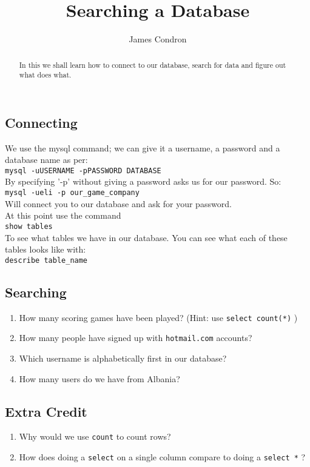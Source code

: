 \documentclass[10pt,a4paper]{article}
\begin{document}
\title{Searching a Database}
\author{James Condron}
\maketitle

\begin{abstract}
In this we shall learn how to connect to our database, search for data and figure out what does what.
\end{abstract}

\subsection{Connecting}
We use the mysql command; we can give it a username, a password and a database name as per: \\

{\tt mysql -uUSERNAME -pPASSWORD DATABASE } \\

By specifying '-p' without giving a password asks us for our password. So: \\

{\tt mysql -ueli -p our\_game\_company } \\

Will connect you to our database and ask for your password. \\

At this point use the command \\

{\tt show tables } \\

To see what tables we have in our database. You can see what each of these tables looks like with: \\

{\tt describe table\_name } \\

\subsection{Searching}

\begin{enumerate}
\item How many scoring games have been played? (Hint: use  {\tt select count(*)} )
\item How many people have signed up with {\tt hotmail.com} accounts?
\item Which username is alphabetically first in our database?
\item How many users do we have from Albania?
\end{enumerate}


\subsection{Extra Credit}
\begin{enumerate}
\item Why would we use {\tt count} to count rows?
\item How does doing a {\tt select} on a single column compare to doing a {\tt select *} ?
\end{enumerate}
\end{document}
